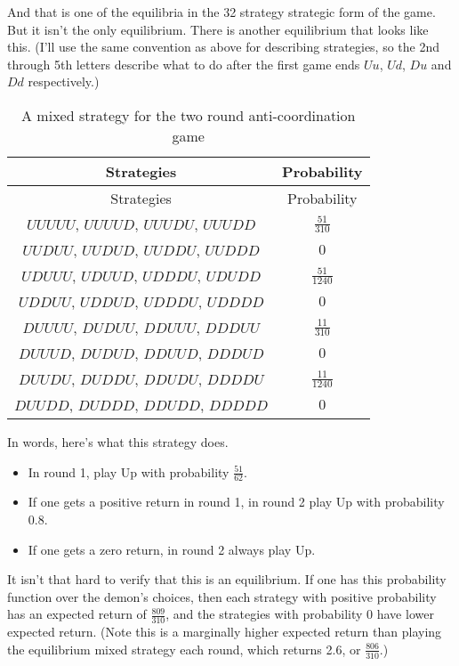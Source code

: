 \documentclass[
  12pt,
]{article}
\providecommand{\tightlist}{%
  \setlength{\itemsep}{0pt}\setlength{\parskip}{0pt}}
\begin{document}
And that is one of the equilibria in the 32 strategy strategic form of
the game. But it isn't the only equilibrium. There is another
equilibrium that looks like this. (I'll use the same convention as above
for describing strategies, so the 2nd through 5th letters describe what
to do after the first game ends \(Uu\), \(Ud\), \(Du\) and \(Dd\)
respectively.)

\begin{longtable}[]{@{}cc@{}}
\caption{A mixed strategy for the two round anti-coordination
game}\tabularnewline
\toprule
Strategies & Probability \\
\midrule
\endfirsthead
\toprule
Strategies & Probability \\
\midrule
\endhead
\(UUUUU\), \(UUUUD\), \(UUUDU\), \(UUUDD\) & \(\frac{51}{310}\) \\
\(UUDUU\), \(UUDUD\), \(UUDDU\), \(UUDDD\) & \(0\) \\
\(UDUUU\), \(UDUUD\), \(UDDDU\), \(UDUDD\) & \(\frac{51}{1240}\) \\
\(UDDUU\), \(UDDUD\), \(UDDDU\), \(UDDDD\) & \(0\) \\
\(DUUUU\), \(DUDUU\), \(DDUUU\), \(DDDUU\) & \(\frac{11}{310}\) \\
\(DUUUD\), \(DUDUD\), \(DDUUD\), \(DDDUD\) & \(0\) \\
\(DUUDU\), \(DUDDU\), \(DDUDU\), \(DDDDU\) & \(\frac{11}{1240}\) \\
\(DUUDD\), \(DUDDD\), \(DDUDD\), \(DDDDD\) & \(0\) \\
\bottomrule
\end{longtable}

In words, here's what this strategy does.

\begin{itemize}
\tightlist
\item
  In round 1, play Up with probability \(\frac{51}{62}\).
\item
  If one gets a positive return in round 1, in round 2 play Up with
  probability 0.8.
\item
  If one gets a zero return, in round 2 always play Up.
\end{itemize}

It isn't that hard to verify that this is an equilibrium. If one has
this probability function over the demon's choices, then each strategy
with positive probability has an expected return of \(\frac{809}{310}\),
and the strategies with probability 0 have lower expected return. (Note
this is a marginally higher expected return than playing the equilibrium
mixed strategy each round, which returns 2.6, or \(\frac{806}{310}\).)
\end{document}
